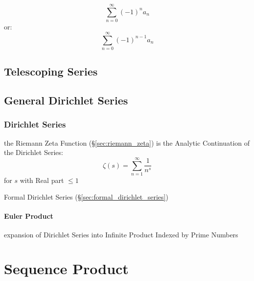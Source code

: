 \[
  \sum_{n=0}^\infty (-1)^n a_n
\]
or:
\[
  \sum_{n=0}^\infty (-1)^{n-1} a_n
\]



\subsection{Telescoping Series}\label{sec:telescoping_series}

\subsection{General Dirichlet Series}\label{sec:general_dirichlet}




\subsubsection{Dirichlet Series}\label{sec:dirichlet_series}

the Riemann Zeta Function (\S\ref{sec:riemann_zeta}) is the Analytic
Continuation of the Dirichlet Series:
\[
  \zeta(s) = \sum_{n=1}^\infty \frac{1}{n^s}
\]
for $s$ with Real part $\leq 1$

\fist Formal Dirichlet Series (\S\ref{sec:formal_dirichlet_series})



\paragraph{Euler Product}\label{sec:euler_product}\hfill

expansion of Dirichlet Series into Infinite Product Indexed by Prime Numbers



\section{Sequence Product}\label{sec:sequence_product}

